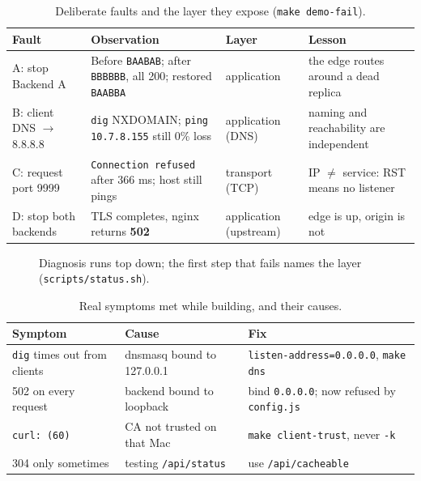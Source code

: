 \documentclass[11pt,a4paper]{article}
\begin{document}
\begin{table}[!htbp]
\centering
\caption{Deliberate faults and the layer they expose (\texttt{make demo-fail}).}
{\small
\begin{tabular}{@{}L{3.0cm}L{5.6cm}L{2.6cm}L{3.2cm}@{}}
\toprule
\textbf{Fault} & \textbf{Observation} & \textbf{Layer} & \textbf{Lesson} \\
\midrule
A: stop Backend A & Before \texttt{BAABAB}; after \texttt{BBBBBB}, all 200; restored \texttt{BAABBA} & application & the edge routes around a dead replica \\
B: client DNS $\to$ 8.8.8.8 & \texttt{dig} NXDOMAIN; \texttt{ping 10.7.8.155} still 0\% loss & application (DNS) & naming and reachability are independent \\
C: request port 9999 & \texttt{Connection refused} after 366 ms; host still pings & transport (TCP) & IP $\neq$ service: RST means no listener \\
D: stop both backends & TLS completes, nginx returns \textbf{502} & application (upstream) & edge is up, origin is not \\
\bottomrule
\end{tabular}}
\end{table}

\begin{figure}[!htbp]
\centering
\resizebox{0.96\textwidth}{!}{\drawDiagnose}
\caption{Diagnosis runs top down; the first step that fails names the layer (\texttt{scripts/status.sh}).}
\end{figure}

\begin{table}[!htbp]
\centering
\caption{Real symptoms met while building, and their causes.}
{\small
\begin{tabular}{@{}L{3.8cm}L{4.8cm}L{5.6cm}@{}}
\toprule
\textbf{Symptom} & \textbf{Cause} & \textbf{Fix} \\
\midrule
\texttt{dig} times out from clients & dnsmasq bound to 127.0.0.1 & \texttt{listen-address=0.0.0.0}, \texttt{make dns} \\
502 on every request & backend bound to loopback & bind \texttt{0.0.0.0}; now refused by \texttt{config.js} \\
\texttt{curl: (60)} & CA not trusted on that Mac & \texttt{make client-trust}, never \texttt{-k} \\
304 only sometimes & testing \texttt{/api/status} & use \texttt{/api/cacheable} \\
\bottomrule
\end{tabular}}
\end{table}
\end{document}
